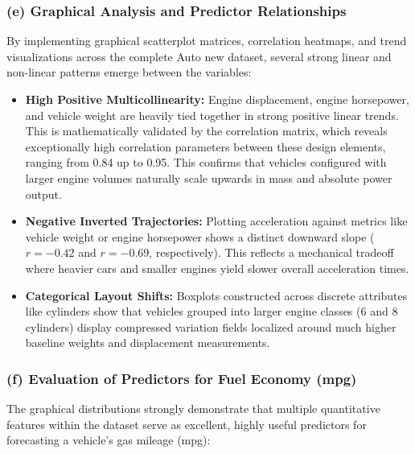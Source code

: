\documentclass[12pt,a4paper]{article}
\begin{document}
\subsubsection*{(e) Graphical Analysis and Predictor Relationships}

By implementing graphical scatterplot matrices, correlation heatmaps, and trend visualizations across the complete Auto new dataset, several strong linear and non-linear patterns emerge between the variables:

\begin{itemize}
    \item \textbf{High Positive Multicollinearity:} Engine displacement, engine horsepower, and vehicle weight are heavily tied together in strong positive linear trends. This is mathematically validated by the correlation matrix, which reveals exceptionally high correlation parameters between these design elements, ranging from 0.84 up to 0.95. This confirms that vehicles configured with larger engine volumes naturally scale upwards in mass and absolute power output.
    \item \textbf{Negative Inverted Trajectories:} Plotting acceleration against metrics like vehicle weight or engine horsepower shows a distinct downward slope ($r=-0.42$ and $r=-0.69$, respectively). This reflects a mechanical tradeoff where heavier cars and smaller engines yield slower overall acceleration times.
    \item \textbf{Categorical Layout Shifts:} Boxplots constructed across discrete attributes like cylinders show that vehicles grouped into larger engine classes (6 and 8 cylinders) display compressed variation fields localized around much higher baseline weights and displacement measurements.
\end{itemize}

\subsubsection*{(f) Evaluation of Predictors for Fuel Economy (mpg)}

The graphical distributions strongly demonstrate that multiple quantitative features within the dataset serve as excellent, highly useful predictors for forecasting a vehicle's gas mileage (mpg):
\end{document}
